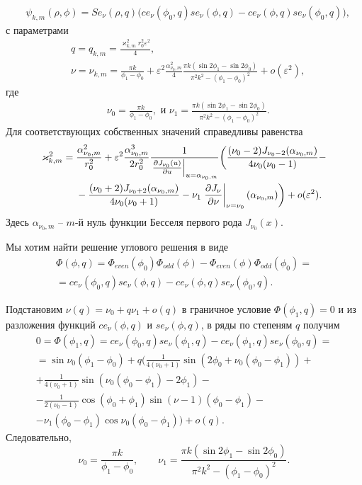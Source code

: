 \begin{align}
&\psi_{k, m}(\rho, \phi) = 
    Se_\nu(\rho, q) \biggl( ce_\nu(\phi_0, q) se_\nu(\phi, q) -ce_\nu(\phi, q) se_\nu(\phi_0, q) \biggr) ,  \label{eq:funB}
\end{align}
с параметрами
\begin{align*}    
    & q=q_{k,m} = \frac{\varkappa_{k,m}^2 r_0^2 \varepsilon^2}{4}, \\ 
&\nu = \nu_{k,m} = \frac{\pi k}{\phi_1-\phi_0} +\varepsilon^2 \frac{\alpha_{\nu_0, m}^2}{4} \frac{\pi k (\sin 2\phi_1 - \sin 2 \phi_0)}{\pi^2k^2-(\phi_1-\phi_0)^2} + o(\varepsilon^2) ,  
\end{align*}
где
\begin{align*}
& \nu_0 = \frac{\pi k}{\phi_1-\phi_0},\text{\ \ и \ \ }
\nu_1= \frac{\pi k (\sin 2\phi_1 - \sin 2 \phi_0)}{\pi^2k^2-(\phi_1-\phi_0)^2} .
\end{align*}
Для соответствующих собственных значений справедливы равенства
\begin{align}
\varkappa_{k, m}^2 ={}& \frac{\alpha_{\nu_0, m}^2}{r_0^2} +  \varepsilon^2 \frac{\alpha_{\nu_0, m}^3}{2 r_0^2}\frac{1}{ \left.\frac{\partial J_{\nu_0}(u)}{\partial u}\right|_{u=\alpha_{\nu_0, m}} }  
 \biggl(\frac{(\nu_0 - 2)J_{\nu_0-2}(\alpha_{\nu_0, m})   }{4\nu_0 (\nu_0-1)} -
\notag \\ 
&{}- \frac{(\nu_0 + 2)J_{\nu_0+2}(\alpha_{\nu_0, m})}{4\nu_0 (\nu_0+1)} 
- \nu_1 \left.\frac{\partial J_\nu}{\partial \nu}\right|_{\nu = \nu_0}(\alpha_{\nu_0, m})
    \biggr) + o(\varepsilon^2).\label{eq:valB}
\end{align}
Здесь $\alpha_{\nu_0,m}$ -- $m$-й нуль функции Бесселя первого рода $J_{\nu_0}(x)$.


Мы хотим найти решение углового решения в виде
\begin{multline*}
\Phi(\phi, q) = \Phi_{even}(\phi_0) \Phi_{odd}(\phi) - \Phi_{even}(\phi) \Phi_{odd}(\phi_0)  = \\
=ce_\nu(\phi_0, q) se_\nu(\phi, q) - ce_\nu(\phi, q) se_\nu(\phi_0, q).
\end{multline*}

 
Подстановим $\nu(q) = \nu_0 + q \nu_1 + o(q)$
в граничное условие  $\Phi(\phi_1, q) = 0$
и из разложения функций $ce_\nu(\phi, q)$ и $se_\nu(\phi, q)$, в ряды по степеням  $q$
 получим
\begin{multline*}
0=\Phi(\phi_1, q) = ce_\nu(\phi_0, q) se_\nu(\phi_1, q) -ce_\nu(\phi_1, q) se_\nu(\phi_0, q) = \\
= \sin \nu_0 (\phi_1 - \phi_0) +q \biggl(
\frac{1}{4(\nu_0+1)}  \sin{(2 \phi_0 + \nu_0(\phi_0-\phi_1))}+  \\
+\frac{1}{4(\nu_0+1)} \sin{(\nu_0(\phi_0-\phi_1)-2\phi_1)} - \\
-\frac{1}{2(\nu_0-1)}\cos{(\phi_0 + \phi_1)}\sin{(\nu-1)(\phi_0-\phi_1)} -\\
- \nu_1 (\phi_0 - \phi_1) \cos{\nu_0(\phi_0-\phi_1)} \biggr) + o(q).
\end{multline*}
Следовательно, 
\begin{equation*}
    \nu_0 = \frac{\pi k}{\phi_1-\phi_0}, \qquad \nu_1 = \frac{\pi k (\sin 2\phi_1 - \sin 2 \phi_0)}{\pi^2k^2-(\phi_1-\phi_0)^2}.
\end{equation*}

